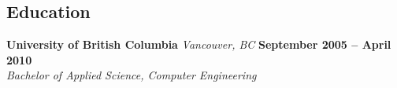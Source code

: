 \documentclass[margin,line]{resume}
\begin{document}
\begin{resume}
	\section{\mysidestyle Education}

	\textbf{University of British Columbia}
		\textsl{ Vancouver, BC}
		\hfill \textbf{September 2005 -- April 2010}
		\vspace{2mm}\\\vspace{1mm}%
	\textsl{Bachelor of Applied Science, Computer Engineering}

%
%

\end{resume}
\end{document}
